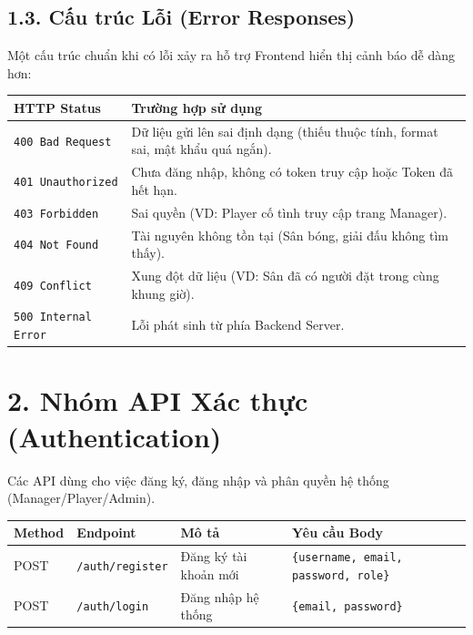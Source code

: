 \documentclass[12pt,a4paper]{article}
\begin{document}
\subsection*{1.3. Cấu trúc Lỗi (Error Responses)}
Một cấu trúc chuẩn khi có lỗi xảy ra hỗ trợ Frontend hiển thị cảnh báo dễ dàng hơn:
\\
\vspace{0.3cm}
\noindent
\renewcommand{\arraystretch}{1.3}
\begin{tabular}{|p{3cm}|p{12.5cm}|}
    \hline
    \textbf{HTTP Status} & \textbf{Trường hợp sử dụng} \\
    \hline
    \texttt{400 Bad Request} & Dữ liệu gửi lên sai định dạng (thiếu thuộc tính, format sai, mật khẩu quá ngắn). \\
    \hline
    \texttt{401 Unauthorized} & Chưa đăng nhập, không có token truy cập hoặc Token đã hết hạn. \\
    \hline
    \texttt{403 Forbidden} & Sai quyền (VD: Player cố tình truy cập trang Manager). \\
    \hline
    \texttt{404 Not Found} & Tài nguyên không tồn tại (Sân bóng, giải đấu không tìm thấy). \\
    \hline
    \texttt{409 Conflict} & Xung đột dữ liệu (VD: Sân đã có người đặt trong cùng khung giờ). \\
    \hline
    \texttt{500 Internal Error} & Lỗi phát sinh từ phía Backend Server. \\
    \hline
\end{tabular}

\section*{2. Nhóm API Xác thực (Authentication)}
Các API dùng cho việc đăng ký, đăng nhập và phân quyền hệ thống (Manager/Player/Admin).

\vspace{0.3cm}
\noindent
\renewcommand{\arraystretch}{1.3}
\begin{tabular}{|p{1.5cm}|p{4cm}|p{5cm}|p{4.5cm}|}
    \hline
    \textbf{Method} & \textbf{Endpoint} & \textbf{Mô tả} & \textbf{Yêu cầu Body} \\
    \hline
    POST & \texttt{/auth/register} & Đăng ký tài khoản mới & \texttt{\{username, email, password, role\}} \\
    \hline
    POST & \texttt{/auth/login} & Đăng nhập hệ thống & \texttt{\{email, password\}} \\
    \hline
\end{tabular}
\vspace{0.2cm}
\end{document}
